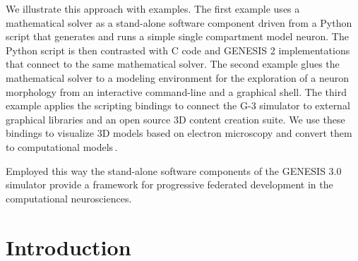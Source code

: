 \documentclass[12pt]{article}
\begin{document}

We illustrate this approach with examples.  The first example uses a
mathematical solver as a stand-alone software component driven from a
Python script that generates and runs a simple single compartment
model neuron.  The Python script is then contrasted with C code and
GENESIS 2 implementations that connect to the same mathematical
solver.  The second example glues the mathematical solver to a
modeling environment for the exploration of a neuron morphology from
an interactive command-line and a graphical shell.  The third example
applies the scripting bindings to connect the G-3 simulator to
external graphical libraries and an open source 3D content creation
suite.  We use these bindings to visualize 3D models based on electron
microscopy and convert them to computational
models\,\cite{cornelis08:_model_neuros_genes}.

Employed this way the stand-alone software components of the GENESIS
3.0 simulator provide a framework for progressive federated
development in the computational neurosciences.


\section{Introduction}
\end{document}
